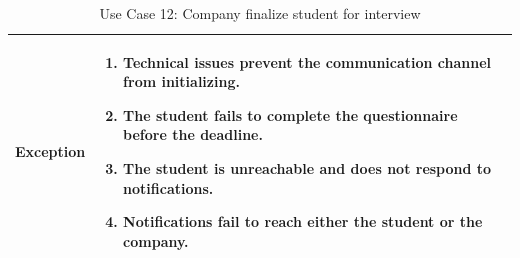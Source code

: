 \begin{table}[H]
\begin{tabular}{|l|p{12cm}|}
    Exception        & 
    \begin{enumerate}
        \item Technical issues prevent the communication channel from initializing.
        \item The student fails to complete the questionnaire before the deadline.
        \item The student is unreachable and does not respond to notifications.
        \item Notifications fail to reach either the student or the company.
\end{enumerate} \\ \hline
\end{tabular}
\caption{Use Case 12: Company finalize student for interview}
\label{tab:user_signup}
\end{table}


